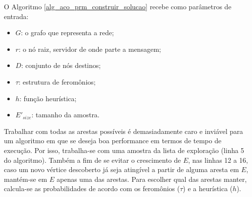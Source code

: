 O Algoritmo \ref{alg_aco_prm_construir_solucao} recebe como parâmetros de entrada:

\begin{itemize}
	\item $G$: o grafo que representa a rede;
	\item $r$: o nó raiz, servidor de onde parte a mensagem;
	\item $D$: conjunto de nós destinos;
	\item $\tau$: estrutura de feromônios;
	\item $h$: função heurística;
	\item $E'_{size}$: tamanho da amostra.
\end{itemize}

Trabalhar com todas as arestas possíveis é demasiadamente caro e inviável para um algoritmo em que se deseja boa performance em termos de tempo de execução. Por isso, trabalha-se com uma amostra da lista de exploração (linha 5 do algoritmo). Também a fim de se evitar o crescimento de $E$, nas linhas 12 a 16, caso um novo vértice descoberto já seja atingível a partir de alguma aresta em $E$, mantém-se em $E$ apenas uma das arestas. Para escolher qual das arestas manter, calcula-se as probabilidades de acordo com os feromônios ($\tau$) e a heurística ($h$).